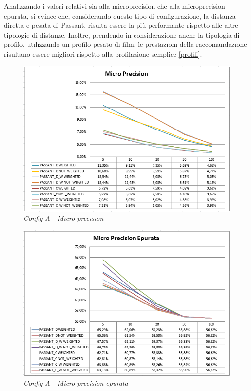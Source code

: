 Analizzando i valori relativi sia alla microprecision che alla microprecision epurata, si evince che, considerando questo tipo di configurazione, la distanza diretta e pesata di Passant, risulta essere la più performante rispetto alle altre tipologie di distanze. Inoltre, prendendo in considerazione anche la tipologia di profilo, utilizzando un profilo pesato di film, le prestazioni della raccomandazione risultano essere migliori rispetto alla profilazione semplice \ref{profili}.
\begin{figure}[H]
	\includegraphics[width=\textwidth]{./images/graphs/micro_prec_Own}
	\caption{\emph{Config A - Micro precision}}
\end{figure}

\begin{figure}[H]
	\includegraphics[width=\textwidth]{./images/graphs/micro_precT_Own}
	\caption{\emph{Config A - Micro precision epurata}}
\end{figure}

